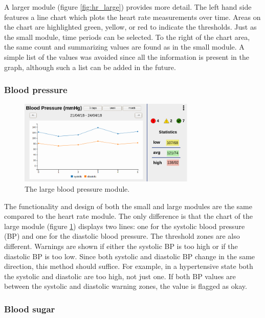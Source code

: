         A larger module (figure \ref{fig:hr_large}) provides more detail. The left hand side features a line chart which plots the heart rate measurements over time. Areas on the chart are highlighted green, yellow, or red to indicate the thresholds. Just as the small module, time periods can be selected. To the right of the chart area, the same count and summarizing values are found as in the small module. A simple list of the values was avoided since all the information is present in the graph, although such a list can be added in the future.

        \subsubsection{Blood pressure}
        
        \begin{figure}[!htb]
            \centering
            \includegraphics[width=0.75\textwidth]{chapters/3_design/mockups/bp_large}
            \caption{The large blood pressure module.}\label{fig:bp_large}
        \end{figure}

        The functionality and design of both the small and large modules are the same compared to the heart rate module. The only difference is that the chart of the large module (figure \ref{fig:bp_large}) displays two lines: one for the systolic blood pressure (BP) and one for the diastolic blood pressure. The threshold zones are also different. Warnings are shown if either the systolic BP is too high or if the diastolic BP is too low. Since both systolic and diastolic BP change in the same direction, this method should suffice. For example, in a hypertensive state both the systolic and diastolic are too high, not just one. If both BP values are between the systolic and diastolic warning zones, the value is flagged as okay.

        \subsubsection{Blood sugar}

